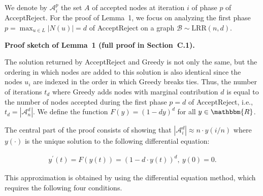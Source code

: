 We denote by $\mathcal{A}^{p}_{i}$ the set $A$ of accepted nodes at iteration $i$ of phase $p$ of AcceptReject. For the proof of
Lemma 1, we focus on analyzing the first phase $p=\max_{u\in L}|N(u)|=d$ of AcceptReject on a graph $\mathcal{B}\sim\text{{LRR}}(n,d)$.\par




\par\medskip\noindent\textbf{Proof sketch of Lemma 1 (full proof in Section C.1).}\par



The solution returned by AcceptReject and Greedy is not only the same, but the ordering in which nodes are added to this solution is also identical since the nodes $u_{i}$ are indexed in the order in which Greedy breaks ties. Thus, the number of iterations $t_{d}$ where Greedy adds nodes with marginal contribution $d$ is equal to the number of nodes accepted during the first phase $p=d$ of AcceptReject, i.e., $t_{d}=|\mathcal{A}^{d}_{n}|$. We define the function $F(y)=\left(1-dy\right)^{d}$ for all $y\in\mathbbm{R}$.\par




The central part of the proof consists of showing that $|\mathcal{A}^{d}_{i}|\approx n\cdot y(i/n)$ where $y(\cdot)$ is the unique solution to the following differential equation:\par


\[\begin{gathered}
\displaystyle y^{\prime}(t)=F(y(t))=\left(1-d\cdot y(t)\right)^{d},\ y(0)=0.
\end{gathered}\]




This approximation is obtained by using the differential equation method, which requires the following four conditions.\par


